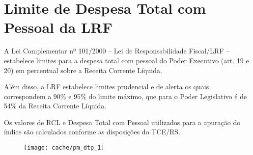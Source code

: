 
\section[Despesa Total com Pessoal]{Limite de Despesa Total com Pessoal da LRF}

A Lei Complementar nº 101/2000 – Lei de Responsabilidade Fiscal/LRF – estabelece limites para a despesa total com pessoal do Poder Executivo (art. 19 e 20) em percentual sobre a Receita Corrente Líquida.

Além disso, a LRF estabelece limites prudencial e de alerta os quais correspondem a 90\% e 95\% do limite máximo, que para o Poder Legislativo é de 54\% da Receita Corrente Líquida.



Os valores de RCL e Despesa Total com Pessoal utilizados para a apuração do índice são calculados conforme as disposições do TCE/RS.

\begin{figure}[H]
\center
\texttt{[image: cache/pm\_dtp\_1]}
\end{figure}


